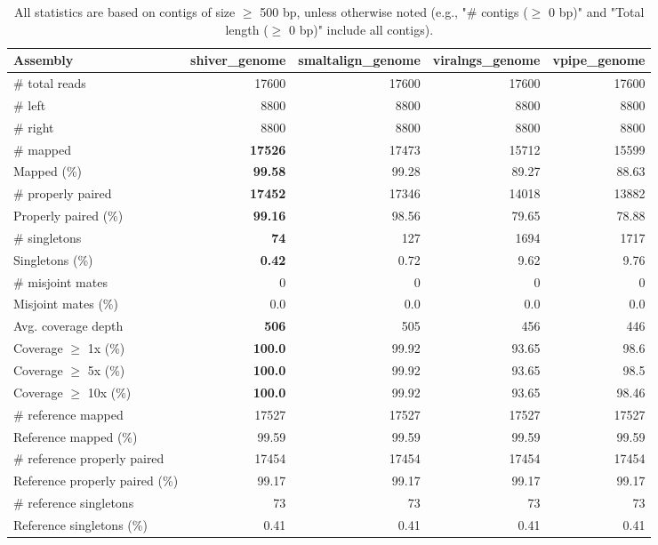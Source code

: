 \documentclass[12pt,a4paper]{article}
\begin{document}
\begin{table}[ht]
\begin{center}
\caption{All statistics are based on contigs of size $\geq$ 500 bp, unless otherwise noted (e.g., "\# contigs ($\geq$ 0 bp)" and "Total length ($\geq$ 0 bp)" include all contigs).}
\begin{tabular}{|l*{4}{|r}|}
\hline
Assembly & shiver\_genome & smaltalign\_genome & viralngs\_genome & vpipe\_genome \\ \hline
\# total reads & 17600 & 17600 & 17600 & 17600 \\ \hline
\# left & 8800 & 8800 & 8800 & 8800 \\ \hline
\# right & 8800 & 8800 & 8800 & 8800 \\ \hline
\# mapped & {\bf 17526} & 17473 & 15712 & 15599 \\ \hline
Mapped (\%) & {\bf 99.58} & 99.28 & 89.27 & 88.63 \\ \hline
\# properly paired & {\bf 17452} & 17346 & 14018 & 13882 \\ \hline
Properly paired (\%) & {\bf 99.16} & 98.56 & 79.65 & 78.88 \\ \hline
\# singletons & {\bf 74} & 127 & 1694 & 1717 \\ \hline
Singletons (\%) & {\bf 0.42} & 0.72 & 9.62 & 9.76 \\ \hline
\# misjoint mates & 0 & 0 & 0 & 0 \\ \hline
Misjoint mates (\%) & 0.0 & 0.0 & 0.0 & 0.0 \\ \hline
Avg. coverage depth & {\bf 506} & 505 & 456 & 446 \\ \hline
Coverage $\geq$ 1x (\%) & {\bf 100.0} & 99.92 & 93.65 & 98.6 \\ \hline
Coverage $\geq$ 5x (\%) & {\bf 100.0} & 99.92 & 93.65 & 98.5 \\ \hline
Coverage $\geq$ 10x (\%) & {\bf 100.0} & 99.92 & 93.65 & 98.46 \\ \hline
\# reference mapped & 17527 & 17527 & 17527 & 17527 \\ \hline
Reference mapped (\%) & 99.59 & 99.59 & 99.59 & 99.59 \\ \hline
\# reference properly paired & 17454 & 17454 & 17454 & 17454 \\ \hline
Reference properly paired (\%) & 99.17 & 99.17 & 99.17 & 99.17 \\ \hline
\# reference singletons & 73 & 73 & 73 & 73 \\ \hline
Reference singletons (\%) & 0.41 & 0.41 & 0.41 & 0.41 \\ \hline

\end{tabular}
\end{center}
\end{table}
\end{document}
